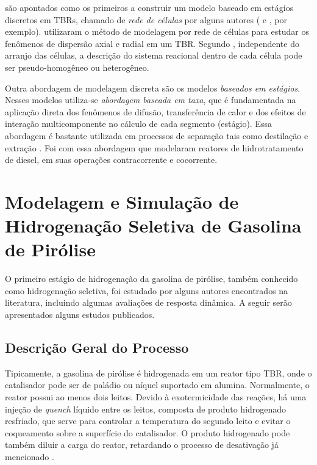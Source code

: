  são apontados como os primeiros a construir um modelo
baseado em estágios discretos em TBRs, chamado de \emph{rede de células} por
alguns autores ( e , por
exemplo).  utilizaram o método de modelagem por rede
de células para estudar os fenômenos de dispersão axial e radial em um TBR.
Segundo , independente do arranjo das células, a
descrição do sistema reacional dentro de cada célula pode ser pseudo-homogêneo ou
heterogêneo.

Outra abordagem de modelagem discreta são os modelos \emph{baseados em
estágios}. Nesses modelos utiliza-se \emph{abordagem baseada em taxa}, que é
fundamentada na aplicação direta dos fenômenos de difusão, transferência de
calor e dos efeitos de interação multicomponente no cálculo de cada segmento
(estágio). Essa abordagem é bastante utilizada em processos de separação tais
como destilação e extração \cite{Jakobsson2004}. Foi com essa abordagem que
 modelaram reatores de hidrotratamento de diesel, em
suas operações contracorrente e cocorrente.

\section {Modelagem e Simulação de Hidrogenação Seletiva de Gasolina de Pirólise}
\label{sec:hidrogenacaopygas}

O primeiro estágio de hidrogenação da gasolina de pirólise, também conhecido
como hidrogenação seletiva, foi estudado por alguns autores encontrados na
literatura, incluindo algumas avaliações de resposta dinâmica. A seguir serão
apresentados alguns estudos publicados.

\subsection{Descrição Geral do Processo} \label{sec:descricaogeral}

Tipicamente, a gasolina de pirólise é hidrogenada em um reator tipo TBR, onde o
catalisador pode ser de paládio ou níquel suportado em alumina. Normalmente, o
reator possui ao menos dois leitos. Devido à exotermicidade das reações, há uma
injeção de \emph{quench} líquido entre os leitos, composta de produto
hidrogenado resfriado, que serve para controlar a temperatura do segundo leito e
evitar o coqueamento sobre a superfície do catalisador. O produto hidrogenado
pode também diluir a carga do reator, retardando o processo de desativação já
mencionado \cite{Cheng1986,Derrien1986,Arpornwichanop2002,Rojas2014a}.

